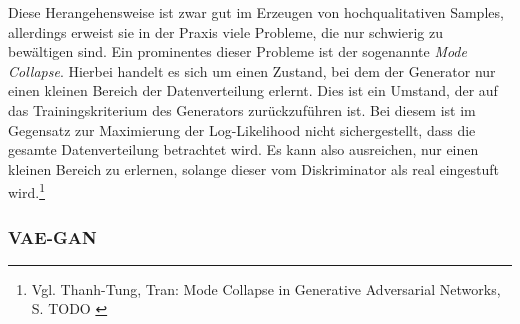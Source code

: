 Diese Herangehensweise ist zwar gut im Erzeugen von hochqualitativen Samples, allerdings erweist sie in der Praxis viele Probleme, die nur schwierig zu bewältigen sind. Ein prominentes dieser Probleme ist der sogenannte \textit{Mode Collapse}. Hierbei handelt es sich um einen Zustand, bei dem der Generator nur einen kleinen Bereich der Datenverteilung erlernt. Dies ist ein Umstand, der auf das Trainingskriterium des Generators zurückzuführen ist. Bei diesem ist im Gegensatz zur Maximierung der Log-Likelihood nicht sichergestellt, dass die gesamte Datenverteilung betrachtet wird. Es kann also ausreichen, nur einen kleinen Bereich zu erlernen, solange dieser vom Diskriminator als real eingestuft wird.\footnote{
    Vgl. Thanh-Tung, Tran: Mode Collapse in Generative Adversarial Networks, S. TODO
    \cite{thanhtung2020catastrophicforgettingmodecollapse}
}

\subsubsection{VAE-GAN}

